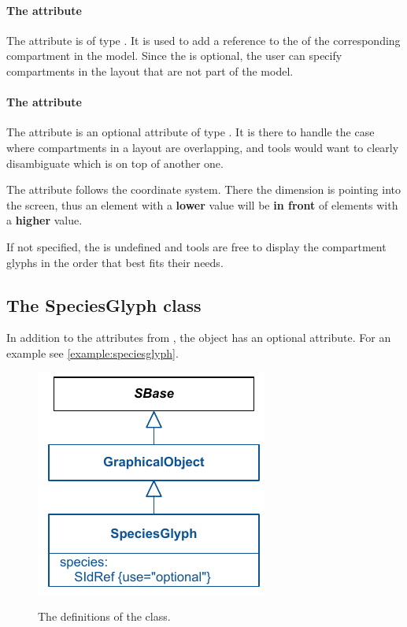 \paragraph{The  attribute}
The  attribute is of type . It 
is used to add a reference to the  of the corresponding 
compartment in the model. Since the  is optional, the 
user can specify compartments in the layout that are not part of the 
model. 

\paragraph{The  attribute}
The  attribute is an optional attribute of type 
. It is there to handle the case where compartments in 
a layout are overlapping, and tools would want to clearly disambiguate 
which \CompartmentGlyph is on top of another one. 


The  attribute follows the coordinate system. There 
the  dimension is pointing into the screen, thus an element 
with a \textbf{lower}  value will be \textbf{in front} of 
elements with a \textbf{higher} value.

If not specified, the  is undefined and tools are free to 
display the compartment glyphs in the order that best fits their needs. 

\subsection{The SpeciesGlyph class}
\label{speciesglyph-class}
In addition to the attributes from \GraphicalObject, the \SpeciesGlyph 
object has an optional  attribute. For an example see \ref{example:speciesglyph}.

\begin{figure}[!h]
\includegraphics{uml/layout-speciesglyph-uml}\\
\label{uml:speciesglyph}
\caption{The definitions of the \SpeciesGlyph class.}
\end{figure}

